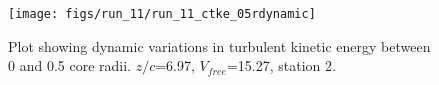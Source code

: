 \begin{figure}[H]
\centering
\texttt{[image: figs/run\_11/run\_11\_ctke\_05rdynamic]}
\caption{Plot showing dynamic variations in turbulent kinetic energy between 0 and 0.5 core radii. $z/c$=6.97, $V_{free}$=15.27, station 2.}
\label{fig:run_11_ctke_05rdynamic}
\end{figure}


